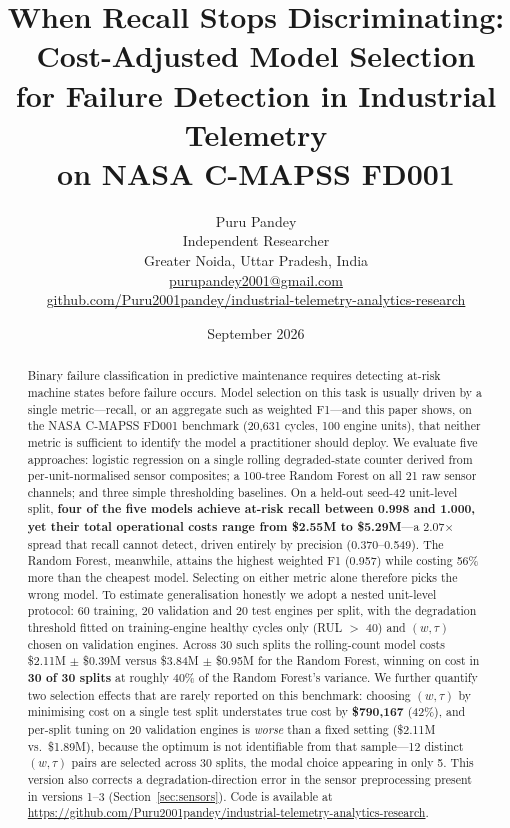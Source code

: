 \documentclass[10pt,twocolumn]{article}
\title{\textbf{When Recall Stops Discriminating: Cost-Adjusted Model Selection}\\
\textbf{for Failure Detection in Industrial Telemetry}\\
\textbf{on NASA C-MAPSS FD001}}
\author{Puru Pandey\\
\small Independent Researcher\\
\small Greater Noida, Uttar Pradesh, India\\
\small \href{mailto:purupandey2001@gmail.com}{purupandey2001@gmail.com}\\
\small \href{https://github.com/Puru2001pandey/industrial-telemetry-analytics-research}{github.com/Puru2001pandey/industrial-telemetry-analytics-research}}
\date{September 2026}
\begin{document}
\maketitle
\thispagestyle{fancy}

\begin{abstract}
Binary failure classification in predictive maintenance requires detecting at-risk
machine states before failure occurs. Model selection on this task is usually driven by
a single metric---recall, or an aggregate such as weighted F1---and this paper shows,
on the NASA C-MAPSS FD001 benchmark (20,631 cycles, 100 engine units), that neither
metric is sufficient to identify the model a practitioner should deploy.
We evaluate five approaches: logistic regression on a single rolling degraded-state
counter derived from per-unit-normalised sensor composites; a 100-tree Random Forest on
all 21 raw sensor channels; and three simple thresholding baselines.
On a held-out seed-42 unit-level split, \textbf{four of the five models achieve at-risk
recall between 0.998 and 1.000, yet their total operational costs range from \$2.55M to
\$5.29M}---a 2.07$\times$ spread that recall cannot detect, driven entirely by precision
(0.370--0.549). The Random Forest, meanwhile, attains the highest weighted F1 (0.957)
while costing 56\% more than the cheapest model.
Selecting on either metric alone therefore picks the wrong model.
To estimate generalisation honestly we adopt a nested unit-level protocol: 60 training,
20 validation and 20 test engines per split, with the degradation threshold fitted on
training-engine healthy cycles only (RUL $>$ 40) and $(w,\tau)$ chosen on validation
engines. Across 30 such splits the rolling-count model costs \$2.11M $\pm$ \$0.39M
versus \$3.84M $\pm$ \$0.95M for the Random Forest, winning on cost in
\textbf{30 of 30 splits} at roughly 40\% of the Random Forest's variance.
We further quantify two selection effects that are rarely reported on this benchmark:
choosing $(w,\tau)$ by minimising cost on a single test split understates true cost by
\textbf{\$790,167} (42\%), and per-split tuning on 20 validation engines is
\emph{worse} than a fixed setting (\$2.11M vs.\ \$1.89M), because the optimum is not
identifiable from that sample---12 distinct $(w,\tau)$ pairs are selected across 30
splits, the modal choice appearing in only 5.
This version also corrects a degradation-direction error in the sensor preprocessing
present in versions 1--3 (Section~\ref{sec:sensors}).
Code is available at
\url{https://github.com/Puru2001pandey/industrial-telemetry-analytics-research}.
\end{abstract}
\end{document}
